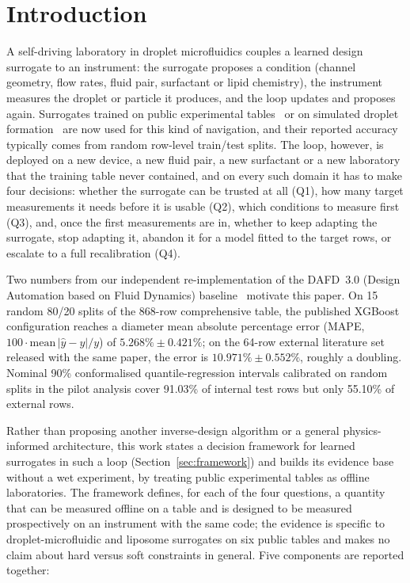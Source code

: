 \documentclass[11pt,a4paper]{article}
\begin{document}
\section{Introduction}
\label{sec:intro}
A self-driving laboratory in droplet microfluidics couples a learned design
surrogate to an instrument: the surrogate proposes a condition (channel
geometry, flow rates, fluid pair, surfactant or lipid chemistry), the
instrument measures the droplet or particle it produces, and the loop updates
and proposes again. Surrogates trained on public experimental
tables~\cite{lashkaripour2021,lashkaripour2024} or on simulated droplet
formation~\cite{samari2025} are now used for this kind of navigation, and
their reported accuracy typically comes from random row-level
train/test splits. The loop, however, is deployed on a new device, a new
fluid pair, a new surfactant or a new laboratory that the training table never
contained, and on every such domain it has to make four decisions: whether
the surrogate can be trusted at all (Q1), how many target measurements it
needs before it is usable (Q2), which conditions to measure first (Q3), and,
once the first measurements are in, whether to keep adapting the surrogate,
stop adapting it, abandon it for a model fitted to the target rows, or
escalate to a full recalibration (Q4).

Two numbers from our independent re-implementation of the DAFD~3.0
(Design Automation based on Fluid Dynamics) baseline~\cite{lashkaripour2024}
motivate this paper. On 15 random 80/20
splits of the 868-row comprehensive table, the published XGBoost configuration
reaches a diameter mean absolute percentage error (MAPE,
$100 \cdot \mathrm{mean}\,|\hat y - y|/y$) of $5.268\% \pm 0.421\%$; on the 64-row external
literature set released with the same paper, the error is
$10.971\% \pm 0.552\%$, roughly a doubling. Nominal 90\% conformalised
quantile-regression intervals calibrated on random splits in the pilot
analysis cover 91.03\% of
internal test rows but only 55.10\% of external rows.

Rather than proposing another inverse-design algorithm or a general
physics-informed architecture, this work states a decision framework for
learned surrogates in such a loop (Section~\ref{sec:framework}) and builds
its evidence base without a wet experiment, by treating public experimental
tables as offline laboratories. The framework defines, for each of the four
questions, a quantity that can be measured offline on a table and is
designed to be measured prospectively on an instrument with the same code; the evidence is specific to
droplet-microfluidic and liposome surrogates on six public tables and makes
no claim about hard versus soft constraints in general. Five components are
reported together:
\end{document}

